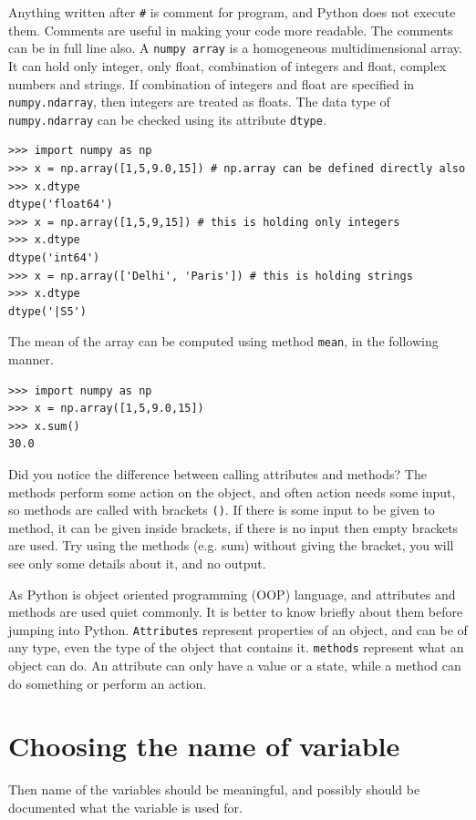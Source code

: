 \documentclass[10pt]{book}
\begin{document}
{Anything written after \verb"#" is comment for program, and Python does not execute them. Comments are useful in making your code more readable. The comments can be in full line also. A \verb"numpy array" is a homogeneous multidimensional array. It can hold only integer, only float, combination of integers and float, complex numbers and strings. If combination of integers and float are specified in \verb"numpy.ndarray", then integers are treated as floats. The data type of \verb"numpy.ndarray" can be checked using its attribute \verb"dtype". 
\beforeverb \begin{verbatim}
>>> import numpy as np
>>> x = np.array([1,5,9.0,15]) # np.array can be defined directly also
>>> x.dtype
dtype('float64')
>>> x = np.array([1,5,9,15]) # this is holding only integers
>>> x.dtype
dtype('int64')
>>> x = np.array(['Delhi', 'Paris']) # this is holding strings
>>> x.dtype
dtype('|S5')
\end{verbatim} \afterverb
The mean of the array can be computed using method \verb"mean", in the following manner.
\beforeverb
\begin{verbatim}
>>> import numpy as np
>>> x = np.array([1,5,9.0,15]) 
>>> x.sum()
30.0
\end{verbatim}
\afterverb
Did you notice the difference between calling attributes and methods? The methods perform some action on the object, and often action needs some input, so methods are called with brackets \verb"()". If there is some input to be given to method, it can be given inside brackets, if there is no input then empty brackets are used. Try using the methods (e.g. sum) without giving the bracket, you will see only some details about it, and no output. 

As Python is object oriented programming (OOP) language, and attributes and methods are used quiet commonly. It is better to know briefly about them before jumping into Python. \verb"Attributes" represent properties of an object, and can be of any type, even the type of the object that contains it. \verb"methods" represent what an object can do. An attribute can only have a value or a state, while a method can do something or perform an action. 

\section{Choosing the name of variable}
Then name of the variables should be meaningful, and possibly should be documented what the variable is used for. 

}
\end{document}
